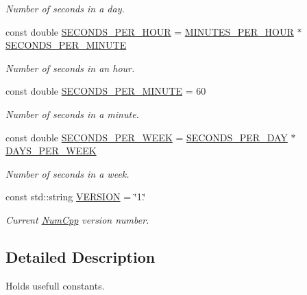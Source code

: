 \begin{DoxyCompactItemize}
\begin{DoxyCompactList}\small\item\em Number of seconds in a day. \end{DoxyCompactList}\item 
const double \mbox{\hyperlink{namespace_num_cpp_1_1_constants_ae640876d26ba37e5e1706d83738b23a8}{S\+E\+C\+O\+N\+D\+S\+\_\+\+P\+E\+R\+\_\+\+H\+O\+UR}} = \mbox{\hyperlink{namespace_num_cpp_1_1_constants_a3043da03b8f81b89353fad8361f40b79}{M\+I\+N\+U\+T\+E\+S\+\_\+\+P\+E\+R\+\_\+\+H\+O\+UR}} $\ast$ \mbox{\hyperlink{namespace_num_cpp_1_1_constants_ab3ee006095e209277bcfeebff5a3d755}{S\+E\+C\+O\+N\+D\+S\+\_\+\+P\+E\+R\+\_\+\+M\+I\+N\+U\+TE}}
\begin{DoxyCompactList}\small\item\em Number of seconds in an hour. \end{DoxyCompactList}\item 
const double \mbox{\hyperlink{namespace_num_cpp_1_1_constants_ab3ee006095e209277bcfeebff5a3d755}{S\+E\+C\+O\+N\+D\+S\+\_\+\+P\+E\+R\+\_\+\+M\+I\+N\+U\+TE}} = 60
\begin{DoxyCompactList}\small\item\em Number of seconds in a minute. \end{DoxyCompactList}\item 
const double \mbox{\hyperlink{namespace_num_cpp_1_1_constants_a9968bb1bca0d3a33456087e1f2e01971}{S\+E\+C\+O\+N\+D\+S\+\_\+\+P\+E\+R\+\_\+\+W\+E\+EK}} = \mbox{\hyperlink{namespace_num_cpp_1_1_constants_aa703dec8b51bafb3c563067d0453db60}{S\+E\+C\+O\+N\+D\+S\+\_\+\+P\+E\+R\+\_\+\+D\+AY}} $\ast$ \mbox{\hyperlink{namespace_num_cpp_1_1_constants_a3e3a9afde968528817a7c33d8e93169e}{D\+A\+Y\+S\+\_\+\+P\+E\+R\+\_\+\+W\+E\+EK}}
\begin{DoxyCompactList}\small\item\em Number of seconds in a week. \end{DoxyCompactList}\item 
const std\+::string \mbox{\hyperlink{namespace_num_cpp_1_1_constants_a4fa5aa3163e77fd3c9d7f563a1dce90c}{V\+E\+R\+S\+I\+ON}} = \char`\"{}1.\char`\"{}
\begin{DoxyCompactList}\small\item\em Current \mbox{\hyperlink{namespace_num_cpp}{Num\+Cpp}} version number. \end{DoxyCompactList}\end{DoxyCompactItemize}


\subsection{Detailed Description}
Holds usefull constants. 

